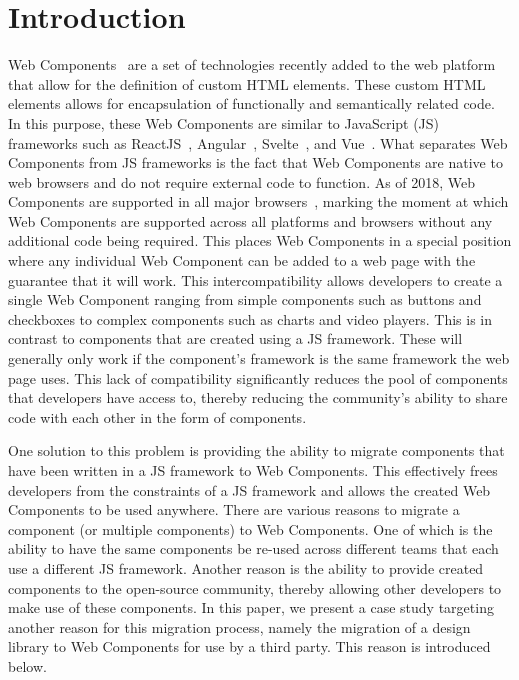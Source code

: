\chapter{Introduction}
Web Components~ are a set of technologies recently added to the web platform that allow for the definition of custom HTML elements. These custom HTML elements allows for encapsulation of functionally and semantically related code. In this purpose, these Web Components are similar to JavaScript (JS) frameworks such as ReactJS~, Angular~, Svelte~, and Vue~. What separates Web Components from JS frameworks is the fact that Web Components are native to web browsers and do not require external code to function. As of 2018, Web Components are supported in all major browsers~, marking the moment at which Web Components are supported across all platforms and browsers without any additional code being required. This places Web Components in a special position where any individual Web Component can be added to a web page with the guarantee that it will work. This intercompatibility allows developers to create a single Web Component ranging from simple components such as buttons and checkboxes to complex components such as charts and video players. This is in contrast to components that are created using a JS framework. These will generally only work if the component's framework is the same framework the web page uses. This lack of compatibility significantly reduces the pool of components that developers have access to, thereby reducing the community's ability to share code with each other in the form of components.

One solution to this problem is providing the ability to migrate components that have been written in a JS framework to Web Components. This effectively frees developers from the constraints of a JS framework and allows the created Web Components to be used anywhere. There are various reasons to migrate a component (or multiple components) to Web Components. One of which is the ability to have the same components be re-used across different teams that each use a different JS framework. Another reason is the ability to provide created components to the open-source community, thereby allowing other developers to make use of these components. In this paper, we present a case study targeting another reason for this migration process, namely the migration of a design library to Web Components for use by a third party. This reason is introduced below.

